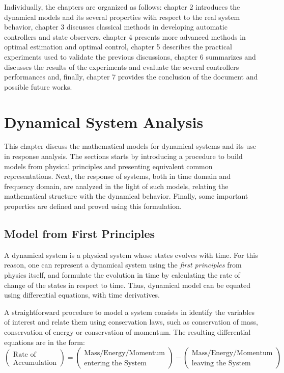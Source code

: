 \documentclass[a4paper,11pt]{book}
\numberwithin{figure}{chapter}
\numberwithin{equation}{chapter}
\numberwithin{table}{chapter}
\theoremstyle{definition}
\begin{document}
Individually, the chapters are organized as follows: chapter 2 introduces the dynamical models and its several properties with respect to the real system behavior, chapter 3 discusses classical methods in developing automatic controllers and state observers, chapter 4 presents more advanced methods in optimal estimation and optimal control, chapter 5 describes the practical experiments used to validate the previous discussions, chapter 6 summarizes and discusses the results of the experiments and evaluate the several controllers performances and, finally, chapter 7 provides the conclusion of the document and possible future works.

\clearpage
\chapter{Dynamical System Analysis}

This chapter discuss the mathematical models for dynamical systems and its use in response analysis. The sections starts by introducing a procedure to build models from physical principles and presenting equivalent common representations. Next, the response of systems, both in time domain and frequency domain, are analyzed in the light of such models, relating the mathematical structure with the dynamical behavior. Finally, some important properties are defined and proved using this formulation.

\section{Model from First Principles}

A dynamical system is a physical system whose states evolves with time. For this reason, one can represent a dynamical system using the \textit{first principles} from physics itself, and formulate the evolution in time by calculating the rate of change of the states in respect to time. Thus, dynamical model can be equated using differential equations, with time derivatives. 

A straightforward procedure to model a system consists in identify the variables of interest and relate them using conservation laws, such as conservation of mass, conservation of energy or conservation of momentum. The resulting differential equations are in the form:
\begin{equation}
	\begin{pmatrix}
		\text{Rate of} \\ \text{Accumulation}
	\end{pmatrix} = \begin{pmatrix}
		\text{Mass/Energy/Momentum} \\ \text{entering the System}
	\end{pmatrix} - \begin{pmatrix}
		\text{Mass/Energy/Momentum} \\ \text{leaving the System}
	\end{pmatrix}
\end{equation}
\end{document}
